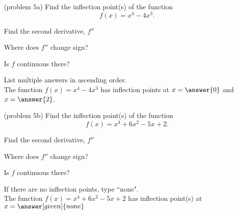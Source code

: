 \documentclass{ximera}
\begin{document}
\begin{problem}(problem 5a)
  Find the inflection point(s) of the function
  \[
     f(x) = x^4 - 4x^3.
  \]
  
    \begin{hint}
      Find the second derivative, $f''$
    \end{hint}
    \begin{hint}
      Where does $f''$ change sign?
    \end{hint}
    \begin{hint}
      Is $f$ continuous there?
    \end{hint}  
		
		List multiple answers in ascending order.\\
		The function $f(x) = x^4 - 4x^3$ has inflection points at 
		$x =\answer{0}$ and $x = \answer{2}$.
		
	
\end{problem}


\begin{problem}(problem 5b)
  Find the inflection point(s) of the function
  \[
     f(x) = x^4 + 6x^2 - 5x + 2.
  \]
  
    \begin{hint}
      Find the second derivative, $f''$
    \end{hint}
    \begin{hint}
      Where does $f''$ change sign?
    \end{hint}
    \begin{hint}
      Is $f$ continuous there?
    \end{hint}  
		If there are no inflection points, type ``none".\\ 
		The function $f(x) = x^4 + 6x^2 - 5x + 2$ has inflection 
		point(s) at $x =\answer[given]{none}$
	
\end{problem}
\end{document}
